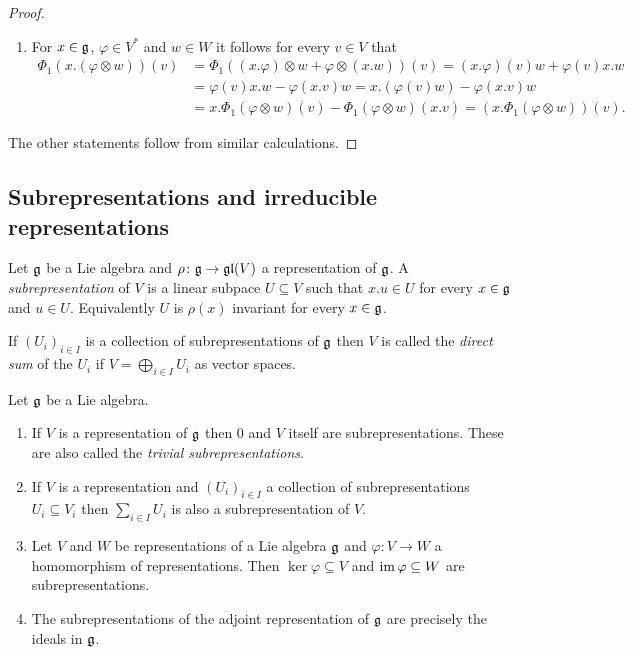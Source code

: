 \begin{proof}
 \begin{enumerate}[leftmargin=*]
  \item
   For $x \in \mathfrak{g}$, $\varphi \in V^*$ and $w \in W$ it follows for every $v \in V$ that
   \begin{align*}
    \Phi_1(x.(\varphi \otimes w))(v)
    &= \Phi_1((x.\varphi) \otimes w + \varphi \otimes (x.w))(v)
    = (x.\varphi)(v) w + \varphi(v) x.w \\
    &= \varphi(v) x.w -\varphi(x.v) w
    = x.(\varphi(v) w) - \varphi(x.v) w \\
    &= x.\Phi_1(\varphi \otimes w)(v) - \Phi_1(\varphi \otimes w)(x.v)
    = (x.\Phi_1(\varphi \otimes w))(v).
   \end{align*}
 \end{enumerate}
 The other statements follow from similar calculations.
\end{proof}





\subsection{Subrepresentations and irreducible representations}


\begin{defi}
 Let $\mathfrak{g}$ be a Lie algebra and $\rho \colon \mathfrak{g} \to \mathfrak{gl}(V)$ a representation of $\mathfrak{g}$. A \emph{subrepresentation} of $V$ is a linear subpace $U \subseteq V$ such that $x.u \in U$ for every $x \in \mathfrak{g}$ and $u \in U$. Equivalently $U$ is $\rho(x)$ invariant for every $x \in \mathfrak{g}$.
 
 If $(U_i)_{i \in I}$ is a collection of subrepresentations of $\mathfrak{g}$ then $V$ is called the \emph{direct sum} of the $U_i$ if $V = \bigoplus_{i \in I} U_i$ as vector spaces.
\end{defi}


\begin{expls}
 Let $\mathfrak{g}$ be a Lie algebra.
 \begin{enumerate}[leftmargin=*]
  \item
   If $V$ is a representation of $\mathfrak{g}$ then $0$ and $V$ itself are subrepresentations. These are also called the \emph{trivial subrepresentations}.
  \item
   If $V$ is a representation and $(U_i)_{i \in I}$ a collection of subrepresentations $U_i \subseteq V_i$ then $\sum_{i \in I} U_i$ is also a subrepresentation of $V$.
  \item
   Let $V$ and $W$ be representations of a Lie algebra $\mathfrak{g}$ and $\varphi \colon V \to W$ a homomorphism of representations. Then $\ker \varphi \subseteq V$ and $\operatorname{im} \varphi \subseteq W$ are subrepresentations.
  \item
   The subrepresentations of the adjoint representation of $\mathfrak{g}$ are precisely the ideals in $\mathfrak{g}$.
 \end{enumerate}
\end{expls}


